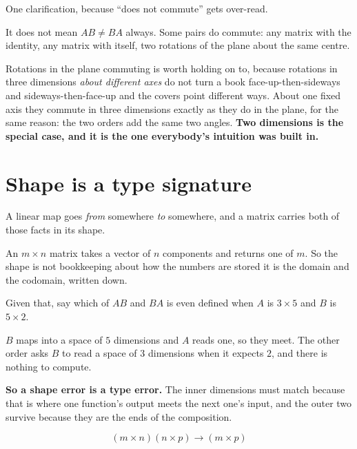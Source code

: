 
\begin{fr}
One clarification, because \enquote{does not commute} gets over-read.

It does not mean $AB \neq BA$ always. Some pairs do commute: any matrix with
the identity, any matrix with itself, two rotations of the plane about the same
centre.

Rotations in the plane commuting is worth holding on to, because rotations in
three dimensions \emph{about different axes} do not \dash{} turn a book
face-up-then-sideways and sideways-then-face-up and the covers point different
ways. About one fixed axis they commute in three dimensions exactly as they do
in the plane, for the same reason: the two orders add the same two
angles. \textbf{Two
dimensions is the special case, and it is the one everybody's intuition was
built in.}
\end{fr}

\section{Shape is a type signature}
\label{sec:P06-shape}

\begin{fr}
A linear map goes \emph{from} somewhere \emph{to} somewhere, and a matrix
carries both of those facts in its shape.

An $m \times n$ matrix takes a vector of $n$ components and returns one of $m$.
So the shape is not bookkeeping about how the numbers are stored \dash{} it is
the domain and the codomain, written down.

Given that, say which of $AB$ and $BA$ is even defined when $A$ is
$3 \times 5$ and $B$ is $5 \times 2$.
\nextframe
\end{fr}

\begin{fr}
$B$ maps into a space of $5$ dimensions and $A$ reads one, so they meet. The
other order asks $B$ to read a space of $3$ dimensions when it expects $2$, and
there is nothing to compute.

\textbf{So a shape error is a type error.} The inner dimensions must match
because that is where one function's output meets the next one's input, and the
outer two survive because they are the ends of the composition.

\[ (m \times n)(n \times p) \longrightarrow (m \times p) \]
\end{fr}

